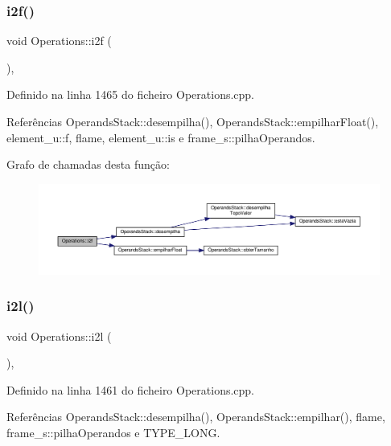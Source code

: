 \subsubsection{\texorpdfstring{i2f()}{i2f()}}
{\footnotesize\ttfamily void Operations\+::i2f (\begin{DoxyParamCaption}{ }\end{DoxyParamCaption})\hspace{0.3cm}{\ttfamily [static]}, {\ttfamily [private]}}



Definido na linha 1465 do ficheiro Operations.\+cpp.



Referências Operands\+Stack\+::desempilha(), Operands\+Stack\+::empilhar\+Float(), element\+\_\+u\+::f, flame, element\+\_\+u\+::is e frame\+\_\+s\+::pilha\+Operandos.

Grafo de chamadas desta função\+:
\nopagebreak
\begin{figure}[H]
\begin{center}
\leavevmode
\includegraphics[width=350pt]{classOperations_a4880878630a620c325840fc7980dc131_cgraph}
\end{center}
\end{figure}
\mbox{\label{classOperations_ae5d28665a74411cbb880e3007c5405e8}} 
\subsubsection{\texorpdfstring{i2l()}{i2l()}}
{\footnotesize\ttfamily void Operations\+::i2l (\begin{DoxyParamCaption}{ }\end{DoxyParamCaption})\hspace{0.3cm}{\ttfamily [static]}, {\ttfamily [private]}}



Definido na linha 1461 do ficheiro Operations.\+cpp.



Referências Operands\+Stack\+::desempilha(), Operands\+Stack\+::empilhar(), flame, frame\+\_\+s\+::pilha\+Operandos e T\+Y\+P\+E\+\_\+\+L\+O\+NG.

